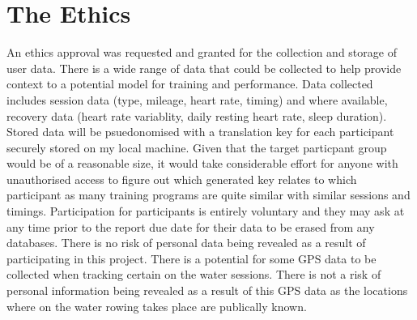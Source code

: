 \documentclass[a4paper]{article}
\begin{document}
\section{The Ethics}
An ethics approval was requested and granted for the collection and storage of user data. There is a wide range of data that could be collected to help provide context to a potential model for training and performance. Data collected includes session data (type, mileage, heart rate, timing) and where available, recovery data (heart rate variablity, daily resting heart rate, sleep duration). Stored data will be psuedonomised with a translation key for each participant securely stored on my local machine. Given that the target particpant group would be of a reasonable size, it would take considerable effort for anyone with unauthorised access to figure out which generated key relates to which participant as many training programs are quite similar with similar sessions and timings. Participation for participants is entirely voluntary and they may ask at any time prior to the report due date for their data to be erased from any databases. There is no risk of personal data being revealed as a result of participating in this project. There is a potential for some GPS data to be collected when tracking certain on the water sessions. There is not a risk of personal information being revealed as a result of this GPS data as the locations where on the water rowing takes place are publically known.

% 
% 
\printbibliography
\end{document}
